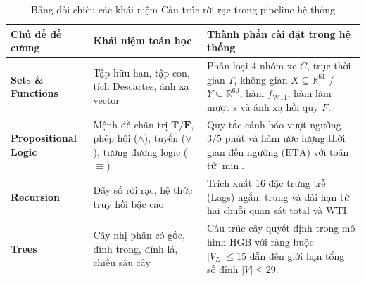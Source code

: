 \begin{table}[htbp]
    \centering
    \small
    \caption{Bảng đối chiếu các khái niệm Cấu trúc rời rạc trong pipeline hệ thống}
    \begin{tabular}{|p{3.2cm}|p{4.2cm}|p{6.8cm}|}
    \hline
    \textbf{Chủ đề đề cương} & \textbf{Khái niệm toán học} & \textbf{Thành phần cài đặt trong hệ thống} \\ \hline
    \textbf{Sets \& Functions} & Tập hữu hạn, tập con, tích Descartes, ánh xạ vector & Phân loại 4 nhóm xe $C$, trục thời gian $T$, không gian $X \subseteq \mathbb{R}^{61}$ / $Y \subseteq \mathbb{R}^{60}$, hàm $f_{\text{WTI}}$, hàm làm mượt $s$ và ánh xạ hồi quy $F$. \\ \hline
    \textbf{Propositional Logic} & Mệnh đề chân trị $\mathbf{T}/\mathbf{F}$, phép hội ($\land$), tuyển ($\lor$), tương đương logic ($\equiv$) & Quy tắc cảnh báo vượt ngưỡng $3/5$ phút và hàm ước lượng thời gian đến ngưỡng ($\text{ETA}$) với toán tử $\min$. \\ \hline
    \textbf{Recursion} & Dãy số rời rạc, hệ thức truy hồi bậc cao & Trích xuất 16 đặc trưng trễ (Lags) ngắn, trung và dài hạn từ hai chuỗi quan sát $\text{total}$ và $\text{WTI}$. \\ \hline
    \textbf{Trees} & Cây nhị phân có gốc, đỉnh trong, đỉnh lá, chiều sâu cây & Cấu trúc cây quyết định trong mô hình HGB với ràng buộc $|V_L| \le 15$ dẫn đến giới hạn tổng số đỉnh $|V| \le 29$. \\ \hline
    \end{tabular}
\end{table}